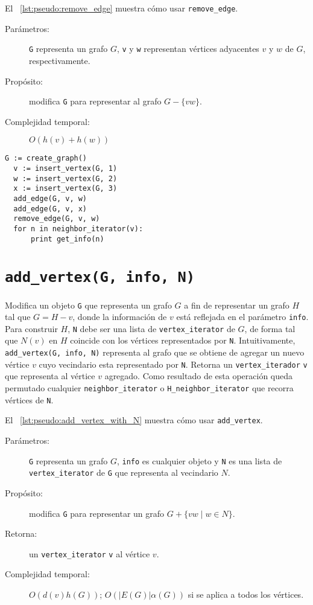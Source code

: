 \documentclass[%
    a4paper,%
    fontsize=12pt,%
    DIV=12,
    twoside,%
    openright,%
    titlepage=true,%
    headsepline,%
    toc=bibliography,%
    parskip=half,%
    cleardoublepage=empty,%
    headings=big,%
]{scrbook}
\makeatletter
\newcommand{\Code}[1]{\lstinline[basicstyle={\ttfamily}]@#1@}
\makeatother
\begin{document}
El \lstlistingname~\ref{lst:pseudo:remove_edge} muestra cómo usar \Code{remove_edge}.

\begin{description}
  \item [Parámetros:] \Code{G} representa un grafo $G$, \Code{v} y \Code{w} representan vértices adyacentes $v$ y $w$ de $G$, respectivamente.
  \item [Propósito:] modifica \Code{G} para representar al grafo $G - \{vw\}$.
  \item [Complejidad temporal:] $O(h(v) + h(w))$
\end{description}


\begin{lstlisting}[caption={Ejemplo de uso de \Code{remove_edge} para imprimir $3$.  Ver Sección~\ref{sec:tad grafo:neighbor-iterator} para más información de \Code{neghbor_iterator}.},gobble=2,float=ht,label={lst:pseudo:remove_edge},emph={remove_edge}]
  G := create_graph()
  v := insert_vertex(G, 1)
  w := insert_vertex(G, 2)
  x := insert_vertex(G, 3)
  add_edge(G, v, w)
  add_edge(G, v, x)
  remove_edge(G, v, w)
  for n in neighbor_iterator(v):
      print get_info(n)
\end{lstlisting}


\section{\texorpdfstring{\Code{add_vertex(G, info, N)}}{add\_vertex(G, info, N)}}
\label{sec:tad grafo:add-vertex}

Modifica un objeto \Code{G} que representa un grafo $G$ a fin de representar un grafo $H$ tal que $G = H - v$, donde la información de $v$ está reflejada en el parámetro \Code{info}.  Para construir $H$, \Code{N} debe ser una lista de \Code{vertex_iterator} de $G$, de forma tal que $N(v)$ en $H$ coincide con los vértices representados por \Code{N}.   Intuitivamente, \Code{add_vertex(G, info, N)} representa al grafo que se obtiene de agregar un nuevo vértice $v$ cuyo vecindario esta representado por \Code{N}.  Retorna un \Code{vertex_iterador} \Code{v} que representa al vértice $v$ agregado.  Como resultado de esta operación queda permutado cualquier \Code{neighbor_iterator} o \Code{H_neighbor_iterator} que recorra vértices de \Code{N}.

El \lstlistingname~\ref{lst:pseudo:add_vertex_with_N} muestra cómo usar \Code{add_vertex}.

\begin{description}
  \item [Parámetros:] \Code{G} representa un grafo $G$, \Code{info} es cualquier objeto y \Code{N} es una lista de \Code{vertex_iterator} de \Code{G} que representa al vecindario $N$.
  \item [Propósito:] modifica \Code{G} para representar un grafo $G + \{vw \mid w \in N\}$.
  \item [Retorna:] un \Code{vertex_iterator} \Code{v} al vértice $v$.
  \item [Complejidad temporal:] $O(d(v)h(G))$; $O(|E(G)|\alpha(G))$ si se aplica a todos los vértices.
\end{description}
\end{document}
